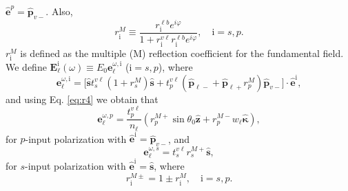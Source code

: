 $\hat{\mathbf{e}}^{p}=\hat{\mathbf{p}}_{v-}$. Also,
\begin{equation}\label{mvrm}
r^{M}_{\mathrm{i}} \equiv
\frac{r^{\ell b}_{\mathrm{i}}e^{i\varphi}}{1+r^{v\ell}_{\mathrm{i}}r^{\ell b}_{\mathrm{i}}e^{i\varphi}}, \quad \mathrm{i}=s,p.
\end{equation}
$r^{M}_{\mathrm{i}}$ is defined as the multiple (M) reflection coefficient for
the fundamental field. We define $\mathbf{E}^{\mathrm{i}}_{\ell}(\omega)\equiv
E_{0}\mathbf{e}^{\omega,\mathrm{i}}_{\ell}$ ($\mathrm{i}=s,p$), where
\begin{equation}\label{eq:mcvew2}
\mathbf{e}^{\omega,\mathrm{i}}_\ell 
= \Big[\hat{\mathbf{s}} t^{v\ell}_s(1+r^M_s)\hat{\mathbf{s}} 
+ t^{v\ell}_p\left(\hat{\mathbf{p}}_{\ell-}+\hat{\mathbf{p}}_{\ell+}r^{M}_p 
\right)\hat{\mathbf{p}}_{v-}
\Big]\cdot\hat{\mathbf{e}}^{\mathrm{i}},
\end{equation}
and using Eq. \eqref{eq:r4} we obtain that
\begin{equation}\label{eq:mcvep}
\mathbf{e}^{\omega,p}_{\ell}=\frac{t^{v\ell}_{p}}{n_{\ell}}
\left( 
  r^{M+}_{p}\sin\theta_{0}\hat{\mathbf{z}}
+ r^{M-}_{p}w_{\ell}\hat{\boldsymbol{\kappa}}
\right),
\end{equation} 
for $p$-input polarization with
$\hat{\mathbf{e}}^{\mathrm{i}}=\hat{\mathbf{p}}_{v-}$, and
\begin{equation}\label{eq:mcves}
\mathbf{e}^{\omega,s}_\ell=t^{v\ell}_{s}r^{M+}_{s}\hat{\mathbf{s}},
\end{equation}
for $s$-input polarization with
$\hat{\mathbf{e}}^{\mathrm{i}}=\hat{\mathbf{s}}$, where
\begin{equation}\label{eq:mvc}
r^{M\pm}_{\mathrm{i}}=1\pm r^{M}_{\mathrm{i}},\quad \mathrm{i} = s,p.
\end{equation}


